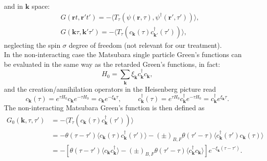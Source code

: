 and in $\mathbf{k}$ space:
\begin{equation}
\begin{split}
    &G(\mathbf{r}t,\mathbf{r}'t')=-\langle T_\tau\left(\psi(\mathbf{r},\tau),\psi^\dagger(\mathbf{r}',\tau')\right)\rangle,\\
    &G(\mathbf{k}\tau,\mathbf{k}'\tau')=-\langle T_\tau\left(c_{\mathbf{k}}(\tau)c^\dagger_{\mathbf{k}'}(\tau')\right)\rangle,
\end{split}
\end{equation}
neglecting the spin $\sigma$ degree of freedom (not relevant for our treatment).\\
In the non-interacting case the Matsubara single particle Green's functions can be evaluated in the same way as the retarded Green's functions, 
in fact:
\begin{equation}
    H_0=\sum_{\mathbf{k}}\xi_\mathbf{k}c^\dagger_\mathbf{k}c_\mathbf{k},
\end{equation}
and the creation/annihilation operators in the Heisenberg picture read
\begin{equation}
    c_\mathbf{k}(\tau)=e^{\tau H_0}c_\mathbf{k}e^{-\tau H_0}=c_\mathbf{k}e^{-\xi_\mathbf{k}\tau},\hspace{1cm}c^\dagger_\mathbf{k}(\tau)=e^{\tau H_0}c^\dagger_\mathbf{k}e^{-\tau H_0}=c^\dagger_\mathbf{k}e^{\xi_\mathbf{k}\tau}.
\end{equation}
The non-interacting Matsubara Green's function is then defined as 
\begin{equation}
\begin{split}
    G_0(\mathbf{k},\tau,\tau')&=-\langle T_\tau\left(c_\mathbf{k}(\tau)c^\dagger_\mathbf{k}(\tau')\right)\rangle\\
    &=-\theta(\tau-\tau')\langle c_\mathbf{k}(\tau)c^\dagger_\mathbf{k}(\tau')\rangle-(\pm)_{B,F}\theta(\tau'-\tau)\langle c^\dagger_\mathbf{k}(\tau')c_\mathbf{k}(\tau)\rangle\\
    &=-\left[\theta(\tau-\tau')\langle c_\mathbf{k}c^\dagger_\mathbf{k}\rangle-(\pm)_{B,F}\theta(\tau'-\tau)\langle c_\mathbf{k}^\dagger c_\mathbf{k}\rangle\right]e^{-\xi_\mathbf{k}(\tau-\tau')}.
    \label{free_propagator}
\end{split}
\end{equation}
